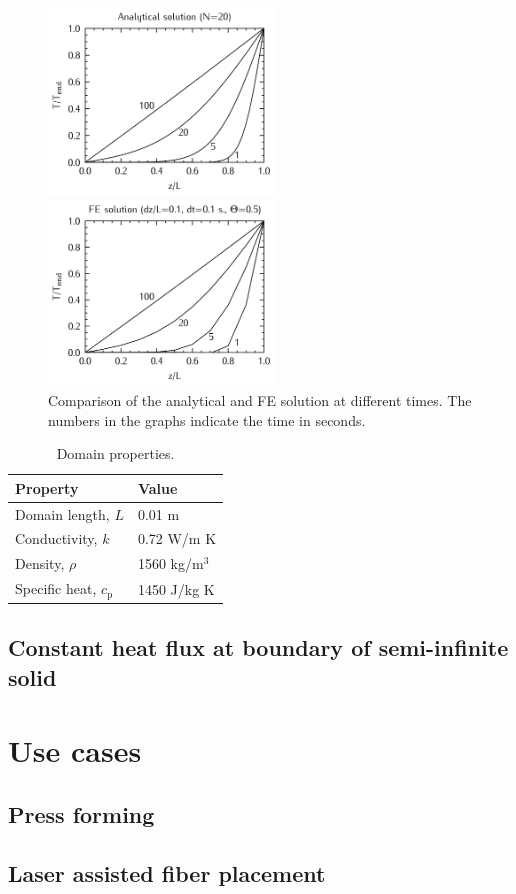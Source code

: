 \documentclass[10pt, a4paper, twoside, headinclude,footinclude, BCOR5mm]{scrartcl}
\begin{document}
\begin{figure}
\centering
\begin{minipage}{.5\textwidth}
  \centering
  \includegraphics[width=60mm]{fig/step_analytical_sol.png}
\end{minipage}%
\begin{minipage}{.5\textwidth}
  \centering
  \includegraphics[width=60mm]{fig/step_FE_t0.5_dt0.1s.png}
\end{minipage}
\caption{Comparison of the analytical and FE solution at different times. The numbers in the graphs indicate the time in seconds.}
\label{fig:step_compare}
\end{figure}
\begin{table}[bt]
\centering
\caption{Domain properties.}
\label{tbl:prop}
\begin{tabular}{ll}
\textbf{Property}          & \textbf{Value} \\\hline
Domain length, $L$         & 0.01 m\\
Conductivity, $k$          & 0.72 W/m K\\
Density, $\rho$            & 1560 kg/m$^3$\\
Specific heat, $c_\text{p}$ & 1450 J/kg K\\\hline
\end{tabular}
\end{table}


\subsection{Constant heat flux at boundary of semi-infinite solid}
\label{sec:org57f413a}



\section{Use cases}
\label{sec:orga60ea4f}

\subsection{Press forming}
\label{sec:orgc42e2b2}

\subsection{Laser assisted fiber placement}
\label{sec:org44c2b41}
\end{document}
